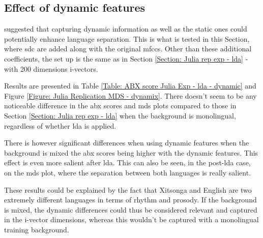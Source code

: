\bigskip
\par \noindent {}



\subsection{Effect of dynamic features} \label{Section: julia rep dynamic}
\citet{carbajal2016language} suggested that capturing dynamic information as well as the static ones could potentially enhance language separation. This is what is tested in this Section, where \acrfull{sdc} are added along with the original \acrshort{mfcc}s. 
Other than these additional coefficients, the set up is the same as in Section \ref{Section: Julia rep exp - lda} - with 200 dimensions i-vectors.
\bigskip
\par \noindent Results are presented in Table \ref{Table: ABX score Julia Exp - lda - dynamic} and Figure \ref{Figure: Julia Replication MDS - dynamix}. There doesn't seem to be any noticeable difference in the abx scores and \acrshort{mds} plots compared to those in Section \ref{Section: Julia rep exp - lda} when the background is monolingual, regardless of whether \acrshort{lda} is applied.
\par There is however significant differences when using dynamic features when the background is mixed the abx scores being higher with the dynamic features. This effect is even more salient after \acrshort{lda}. This can also be seen, in the post-\acrshort{lda} case, on the \acrshort{mds} plot, where the separation between both languages is really salient.  
\par These results could be explained by the fact that Xitsonga and English are two extremely different languages in terms of rhythm and prosody. If the background is mixed, the dynamic differences could thus be considered relevant and captured in the i-vector dimensions, whereas this wouldn't be captured with a monolingual training background.



